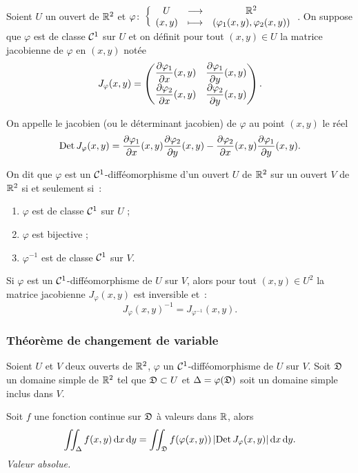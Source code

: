 \begin{defdef}
  Soient \(U\) un ouvert de \(\mathbb{R}^2\) et \(\varphi\colon \left\{\begin{array}{ccc} U & \longrightarrow &\mathbb{R}^2\\ (x,y) & \longmapsto & (\varphi_1(x,y),\varphi_2(x,y)) \end{array} \right.\). On suppose que \(\varphi\) est de classe \(\mathcal{C}^{1}\) sur \(U\) et on définit pour tout \((x,y) \in U\) la matrice jacobienne de \(\varphi\) en \((x,y)\) notée
  \begin{equation}
    J_\varphi(x,y) = \begin{pmatrix} \dfrac{\partial{} \varphi_1}{\partial{} x}(x,y) & \dfrac{\partial{} \varphi_1}{\partial{} y}(x,y) \\ \dfrac{\partial{} \varphi_2}{\partial{} x}(x,y) & \dfrac{\partial{} \varphi_2}{\partial{} y}(x,y) \end{pmatrix}.
  \end{equation}

  On appelle le jacobien (ou le déterminant jacobien) de \(\varphi\) au point \((x,y)\) le réel
  \begin{equation}
    \operatorname{Det} J_\varphi(x,y) = \dfrac{\partial{} \varphi_1}{\partial{} x}(x,y) \dfrac{\partial{} \varphi_2}{\partial{} y}(x,y) - \dfrac{\partial{} \varphi_2}{\partial{} x}(x,y) \dfrac{\partial{} \varphi_1}{\partial{} y}(x,y).
  \end{equation}
\end{defdef}
%
\begin{defdef}
  On dit que \(\varphi\) est un \(\mathcal{C}^{1}\)-difféomorphisme d'un ouvert \(U\) de \(\mathbb{R}^2\) sur un ouvert \(V\) de \(\mathbb{R}^2\) si et seulement si~:
  \begin{enumerate}
    \item \(\varphi\) est de classe \(\mathcal{C}^{1}\) sur \(U\) ;
    \item \(\varphi\) est bijective ;
    \item \(\varphi^{-1}\) est de classe \(\mathcal{C}^{1}\) sur \(V\).
  \end{enumerate}
\end{defdef}
%
\begin{prop}[Admise]
  Si \(\varphi\) est un \(\mathcal{C}^{1}\)-difféomorphisme de \(U\) sur \(V\), alors pour tout \((x,y) \in U^2\) la matrice jacobienne \(J_\varphi(x,y)\) est inversible et~:
  \begin{equation}
    J_\varphi(x,y)^{-1} = J_{\varphi^{-1}}(x,y).
  \end{equation}
\end{prop}

\subsubsection{Théorème de changement de variable}

\begin{theo}
  Soient \(U\) et \(V\) deux ouverts de \(\mathbb{R}^2\), \(\varphi\) un \(\mathcal{C}^{1}\)-difféomorphisme de \(U\) sur \(V\). Soit \(\mathfrak{D}\) un domaine simple de \(\mathbb{R}^2\) tel que \(\mathfrak{D} \subset U\) et \(\Delta = \varphi(\mathfrak{D})\) soit un domaine simple inclus dans \(V\).

  Soit \(f\) une fonction continue sur \(\mathfrak{D}\) à valeurs dans \(\mathbb{R}\), alors
  \begin{equation}
    \iint_\Delta f(x,y)\mathop{}\mathopen{}\mathrm{d} x \mathop{}\mathopen{}\mathrm{d} y = \iint_{\mathfrak{D}} f(\varphi(x,y)) \left\lvert\operatorname{Det} J_\varphi(x,y)\right\rvert\mathop{}\mathopen{}\mathrm{d} x \mathop{}\mathopen{}\mathrm{d} y.
  \end{equation}
  \emph{Valeur absolue.}
\end{theo}

